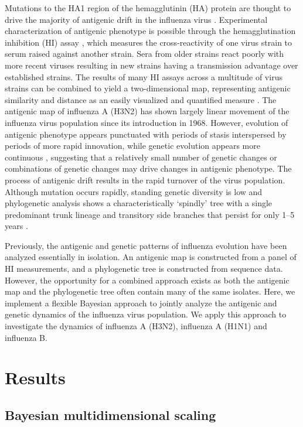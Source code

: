 \documentclass[11pt,oneside,letterpaper]{article}
\begin{document}
Mutations to the HA1 region of the hemagglutinin (HA) protein are thought to drive the majority of antigenic drift in the influenza virus \cite{Nelson07NatRevGenet}. 
Experimental characterization of antigenic phenotype is possible through the hemagglutination inhibition (HI) assay \cite{Hirst43}, which measures the cross-reactivity of one virus strain to serum raised against another strain. 
Sera from older strains react poorly with more recent viruses resulting in new strains having a transmission advantage over established strains. 
The results of many HI assays across a multitude of virus strains can be combined to yield a two-dimensional map, representing antigenic similarity and distance as an easily visualized and quantified measure \cite{Smith04}. 
The antigenic map of influenza A (H3N2) has shown largely linear movement of the influenza virus population since its introduction in 1968. However, evolution of antigenic phenotype appears punctuated with periods of stasis interspersed by periods of more rapid innovation, while genetic evolution appears more continuous \cite{Smith04}, suggesting that a relatively small number of genetic changes or combinations of genetic changes may drive changes in antigenic phenotype. 
The process of antigenic drift results in the rapid turnover of the virus population. 
Although mutation occurs rapidly, standing genetic diversity is low and phylogenetic analysis shows a characteristically `spindly' tree with a single predominant trunk lineage and transitory side branches that persist for only 1--5 years \cite{Fitch97}.

Previously, the antigenic and genetic patterns of influenza evolution have been analyzed essentially in isolation. 
An antigenic map is constructed from a panel of HI measurements, and a phylogenetic tree is constructed from sequence data. 
However, the opportunity for a combined approach exists as both the antigenic map and the phylogenetic tree often contain many of the same isolates. 
Here, we implement a flexible Bayesian approach to jointly analyze the antigenic and genetic dynamics of the influenza virus population. 
We apply this approach to investigate the dynamics of influenza A (H3N2), influenza A (H1N1) and influenza B. 

\section*{Results}

\subsection*{Bayesian multidimensional scaling}
\end{document}
